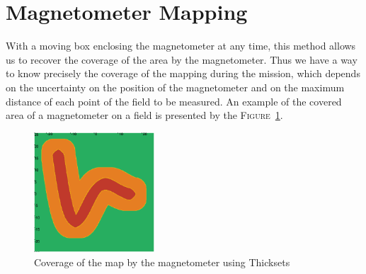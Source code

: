 \section*{Magnetometer Mapping}
    With a moving box enclosing the magnetometer at any time, this method allows us to recover the coverage of the area by the magnetometer. Thus we have a way to know precisely the coverage of the mapping during the mission, which depends on the uncertainty on the position of the magnetometer and on the maximum distance of each point of the field to be measured. An example of the covered area of a magnetometer on a field is presented by the \textsc{Figure}~\ref{fig:thickset_trajectory}.

    \begin{figure}[!htb]
        \centering
        \includegraphics[width=0.4\textwidth]{imgs/thickset_fine_cmap.png}
        \caption{\label{fig:thickset_trajectory} Coverage of the map by the magnetometer using Thicksets}
    \end{figure}
    